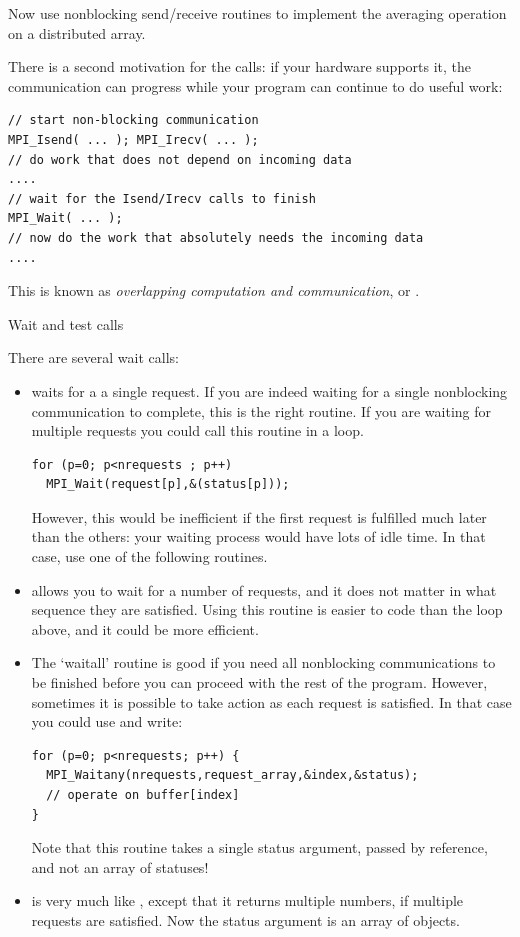 \begin{exercise}
  \label{ex:3ptnonblock}
  Now use nonblocking send/receive routines to implement
  the averaging operation on a distributed array.
\end{exercise}

There is a second motivation for the  calls:
if your hardware supports it, the communication can progress
while your program can continue to do useful work:
\begin{verbatim}
// start non-blocking communication
MPI_Isend( ... ); MPI_Irecv( ... );
// do work that does not depend on incoming data
....
// wait for the Isend/Irecv calls to finish
MPI_Wait( ... );
// now do the work that absolutely needs the incoming data
....
\end{verbatim}
This is known as \emph{overlapping computation and communication},
or .

 {Wait and test calls}

There are several wait calls:
\begin{itemize}
\item {} waits for a a single request. If you are
  indeed waiting for a single nonblocking communication to complete,
  this is the right routine. If you are waiting for multiple requests
  you could call this routine in a loop. 
\begin{verbatim}
for (p=0; p<nrequests ; p++)
  MPI_Wait(request[p],&(status[p]));
\end{verbatim}
  However, this would be inefficient if the first request is fulfilled much later than 
  the others: your waiting process would have lots of idle time. In that case,
  use one of the following routines.
\item {} allows you to wait for a number of
  requests, and it does not matter in what sequence they are
  satisfied. Using this routine is easier to code than the loop above,
  and it could be more efficient.
\item The `waitall' routine is good if you need all nonblocking
  communications to be finished before you can proceed with the rest
  of the program. However, sometimes it is possible to take action as
  each request is satisfied. In that case you could use
   and write:
\begin{verbatim}
for (p=0; p<nrequests; p++) {
  MPI_Waitany(nrequests,request_array,&index,&status);
  // operate on buffer[index]
}
\end{verbatim}
  Note that this routine takes a single status argument, passed by reference,
  and not an array of statuses!
\item {} is very much like ,
  except that it returns multiple numbers, if multiple requests are
  satisfied. Now the status argument is an array of  objects.
\end{itemize}

